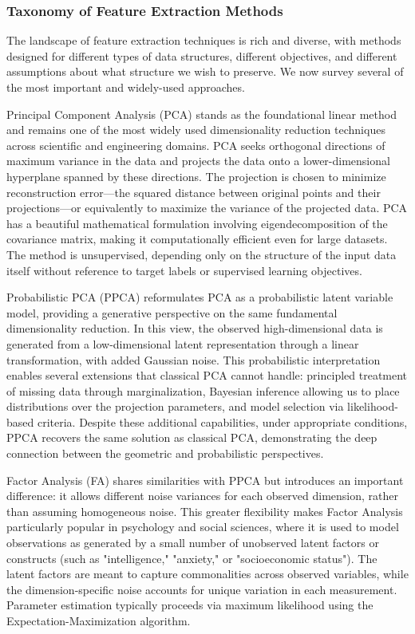 \subsubsection*{Taxonomy of Feature Extraction Methods}

The landscape of feature extraction techniques is rich and diverse, with methods designed for different types of data structures, different objectives, and different assumptions about what structure we wish to preserve. We now survey several of the most important and widely-used approaches.

Principal Component Analysis (PCA) stands as the foundational linear method and remains one of the most widely used dimensionality reduction techniques across scientific and engineering domains. PCA seeks orthogonal directions of maximum variance in the data and projects the data onto a lower-dimensional hyperplane spanned by these directions. The projection is chosen to minimize reconstruction error—the squared distance between original points and their projections—or equivalently to maximize the variance of the projected data. PCA has a beautiful mathematical formulation involving eigendecomposition of the covariance matrix, making it computationally efficient even for large datasets. The method is unsupervised, depending only on the structure of the input data itself without reference to target labels or supervised learning objectives.

Probabilistic PCA (PPCA) reformulates PCA as a probabilistic latent variable model, providing a generative perspective on the same fundamental dimensionality reduction. In this view, the observed high-dimensional data is generated from a low-dimensional latent representation through a linear transformation, with added Gaussian noise. This probabilistic interpretation enables several extensions that classical PCA cannot handle: principled treatment of missing data through marginalization, Bayesian inference allowing us to place distributions over the projection parameters, and model selection via likelihood-based criteria. Despite these additional capabilities, under appropriate conditions, PPCA recovers the same solution as classical PCA, demonstrating the deep connection between the geometric and probabilistic perspectives.

Factor Analysis (FA) shares similarities with PPCA but introduces an important difference: it allows different noise variances for each observed dimension, rather than assuming homogeneous noise. This greater flexibility makes Factor Analysis particularly popular in psychology and social sciences, where it is used to model observations as generated by a small number of unobserved latent factors or constructs (such as "intelligence," "anxiety," or "socioeconomic status"). The latent factors are meant to capture commonalities across observed variables, while the dimension-specific noise accounts for unique variation in each measurement. Parameter estimation typically proceeds via maximum likelihood using the Expectation-Maximization algorithm.

